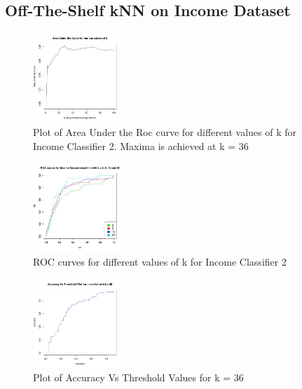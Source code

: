 \subsection{Off-The-Shelf kNN on Income Dataset}
	\begin{figure}[h]
		\label{fig:classifier2_auc}
		\caption{Plot of Area Under the Roc curve for different values of k for Income Classifier 2. Maxima is achieved at k = 36}
		\centering
		\includegraphics[width=0.3\textwidth]{images/native-knn/auc.jpg}
	\end{figure}	
	\begin{figure}
		\label{fig:classifier2_roc}
		\caption{ROC curves for different values of k for Income Classifier 2}
		\centering
		\includegraphics[width=0.3\textwidth]{images/native-knn/roc.jpg}
	\end{figure}
	\begin{figure}
		\label{fig:classifier2_accuracy}
		\caption{Plot of Accuracy Vs Threshold Values for k = 36}
		\centering
		\includegraphics[width=0.3\textwidth]{images/native-knn/accuracy.jpg}
	\end{figure}
	
